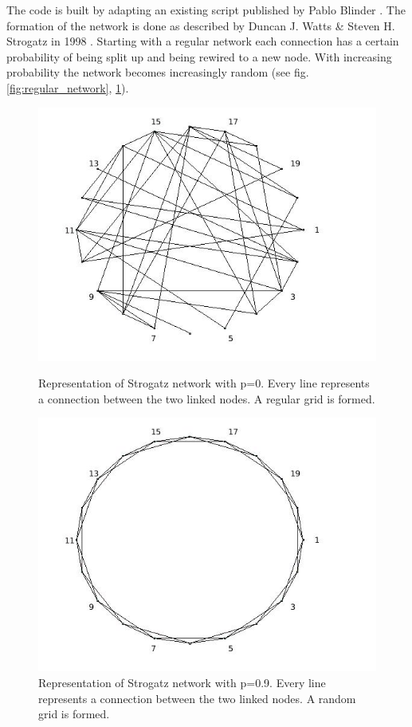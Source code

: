 \documentclass[11pt]{article}
\begin{document}
The code is built by adapting an existing script published by Pablo Blinder \cite{Network1}. The formation of the network is done as described by Duncan J. Watts \& Steven H. Strogatz in 1998 \cite{Network2}. Starting with a regular network each connection has a certain probability of being split up and being rewired to a new node. With increasing probability the network becomes increasingly random (see fig. \ref{fig:regular_network}, \ref{fig:random_network}).

\begin{figure}
	\begin{minipage}[c]{0.45\textwidth}
		\centering
		\includegraphics[width=\textwidth]{Graphs/P0_9_Network.jpg}
		\caption{Representation of Strogatz network with p=0. Every line represents a connection between the two linked nodes. A regular grid is formed.}
		\label{fig:regular_network}
	\end{minipage}
	\hfill
		\begin{minipage}[c]{0.45\textwidth}
			\centering
			\includegraphics[width=\textwidth]{Graphs/Regular_Network.jpg}
			\caption{Representation of Strogatz network with p=0.9. Every line represents a connection between the two linked nodes. A random grid is formed.}
			\label{fig:random_network}
		\end{minipage}
\end{figure}
\end{document}
